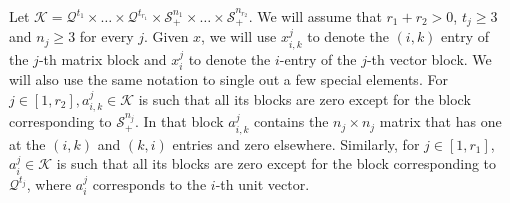 \documentclass{article}
\newcommand{\SOC}[1]{{\mathcal{Q}^{#1}}}
\newcommand{\reInt}{\mathrm{ri}\,}
\newcommand{\PSDcone}[1]{{\mathcal{S}^{#1}_+}}
\newcommand{\minFaceD}{ {\mathcal{F}_{\min}^D}}
\newcommand{\stdCone}{ {\mathcal{K}}}
\newcommand{\stdFace}{ \mathcal{F}}
\newcommand{\opt}[1]{ {\theta _{#1}}}
\renewcommand{\Re}{\mathbb{R}}
\newcommand{\PPS}{{PPS}}
\newtheorem{example}{Example}
\begin{document}
%	
%
\medskip
Let 
$\stdCone = \SOC{t_1} \times \ldots \times \SOC{t_{r_1}} \times \PSDcone{n_1}  \times \ldots \times \PSDcone{n_{r_2}}$.
We will assume that $r_1 + r_2 > 0$,
$t_j \geq 3$ and $n_j \geq 3$ for every $j$. Given $x$, we will use 
$x^j_{i,k}$ to denote the $(i,k)$ entry of the $j$-th matrix block and $x^j_i$ to 
denote the $i$-entry of the $j$-th  vector block. We will also 
use the same notation to single out a few special elements.
For $j \in [1,r_2 ], a^j_{i,k} \in \stdCone$ is
such that all its blocks are zero except for the block corresponding to $\PSDcone{n_j}$. In that block 
$a^j_{i,k}$ contains the $n_j\times n_j$ matrix that has one at the 
$(i,k)$ and $(k,i)$  entries and zero elsewhere. Similarly, for $j \in [1, r_1]$, $a^j_i \in \stdCone$ is such 
that all its blocks are zero except for the block corresponding to $\SOC{t_j}$, where $a^j_i$ corresponds to the $i$-th unit vector.  
\end{document}

